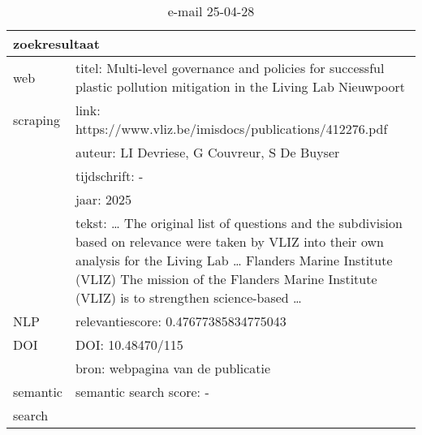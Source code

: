 \begin{table}[h!]
    \caption{e-mail 25-04-28}
    \centering
    \begin{tabularx}{\textwidth}{|p{4cm}|X|} 
        \hline
        \multicolumn{2}{|X|}{\textbf{zoekresultaat}} \\
        \hline
        web &titel: Multi-level governance and policies for successful plastic pollution mitigation in the Living Lab Nieuwpoort\\
        scraping&link: https://www.vliz.be/imisdocs/publications/412276.pdf\\
        &auteur: LI Devriese, G Couvreur, S De Buyser\\
        &tijdschrift: -\\
        &jaar: 2025\\
        &tekst: … The original list of questions and the subdivision based on relevance were taken by VLIZ into their own analysis for the Living Lab … Flanders Marine Institute (VLIZ) The mission of the Flanders Marine Institute (VLIZ) is to strengthen science-based …\\
        \hline
        NLP&relevantiescore: 0.47677385834775043\\
        \hline
        DOI&DOI: 10.48470/115\\
        &bron: webpagina van de publicatie\\
        \hline
        semantic&semantic search score: -\\
        search&\\
        \hline
    \end{tabularx}
    \label{table:email20250428}
\end{table}
